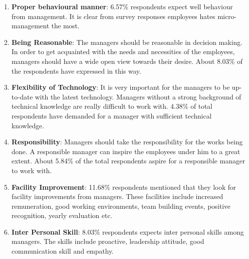 \begin{enumerate}
    \item \textbf{Proper behavioural manner}: 6.57\% respondents expect well behaviour from management. It is clear from survey responses employees hates micro-management the most.
    
    
    \item \textbf{Being Reasonable}:  The managers should be reasonable in decision making. In order to get acquainted with the needs and necessities of the employees, managers should have a wide open view towards their desire. About 8.03\% of the respondents have expressed in this way.
    
    
    \item \textbf{Flexibility of Technology}: It is very important for the managers to be up-to-date with the latest technology. Managers without a strong background of technical knowledge are really difficult to work with. 4.38\% of total respondents have demanded for a manager with sufficient technical knowledge. 
    
    
    
    \item \textbf{Responsibility}: Managers should take the responsibility for the works being done. A responsible manager can inspire the employees under him to a great extent. About 5.84\% of the total respondents aspire for a responsible manager to work with.
    
    
    \item\textbf{Facility Improvement}: 11.68\% respondents mentioned that they look for facility improvements from managers. These facilities include increased remuneration, good working environments, team building events, positive recognition, yearly evaluation etc.
    
    
    \item\textbf{Inter Personal Skill}: 8.03\% respondents expects inter personal skills among managers. The skills include proactive, leadership attitude, good communication skill and empathy.
    

\end{enumerate}
